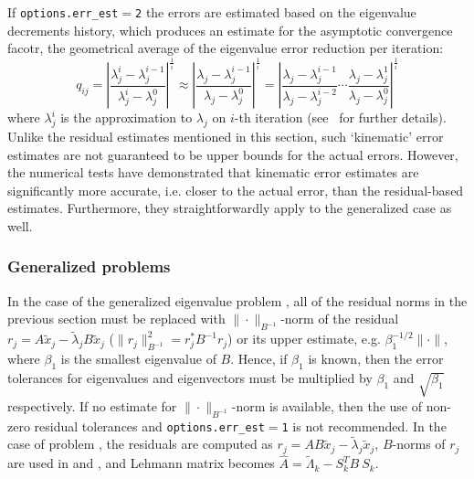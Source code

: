 If {\tt options.err\_est$=$2}
the errors are estimated
based on the eigenvalue decrements history,
which produces an estimate for 
the asymptotic convergence facotr,
the geometrical average of
the eigenvalue error reduction per iteration:
%
\begin{equation}
\label{acf}
q_{ij} =
\left|
\frac
{\lambda_j^i - \lambda_j^{i-1}}
{\lambda_j^i - \lambda_j^0}
\right|^\frac{1}{i}
\approx
\left|
\frac
{\lambda_j - \lambda_j^{i-1}}
{\lambda_j - \lambda_j^0}
\right|^\frac{1}{i}
=
\left|
\frac
{\lambda_j - \lambda_j^{i-1}}
{\lambda_j - \lambda_j^{i-2}}
\cdots
\frac
{\lambda_j - \lambda_j^1}
{\lambda_j - \lambda_j^0}
\right|^\frac{1}{i}
\end{equation}
%
where $\lambda_j^i$ is the approximation to $\lambda_j$ on
$i$-th iteration
(see \report\ for further details).
Unlike the residual estimates mentioned in this section, 
such `kinematic' error estimates are
not guaranteed to be upper bounds for the actual errors.
However, the numerical tests have demonstrated
that kinematic error estimates 
are significantly more accurate,
i.e. closer to the actual error,
than the residual-based estimates. 
Furthermore, they straightforwardly
apply to the generalized case as well.

\subsubsection{Generalized problems}

In the case
of the generalized eigenvalue problem ,
all of the residual norms in the previous section must be replaced
with %
$\|\cdot\|_{B^{-1}}$-norm of the residual
$r_j = A \tilde x_j - \tilde\lambda_j B \tilde x_j$
($\|r_j\|_{B^{-1}}^2 = r_j^* B^{-1} r_j$)
or its upper estimate, e.g. 
$\beta_1^{-1/2}\|\cdot\|$,
where $\beta_1$ is the smallest eigenvalue of $B$.
Hence, if $\beta_1$ is known, then
the error tolerances for eigenvalues and eigenvectors
must be multiplied by $\beta_1$ and $\sqrt{\beta_1}$
respectively. If no estimate for $\|\cdot\|_{B^{-1}}$-norm
is available, then the use of
non-zero residual tolerances and
{\tt options.err\_est$=$1}
is not recommended.
In the case of problem ,
the residuals are computed as
$r_j = A B \tilde x_j - \tilde \lambda_j \tilde x_j$,
$B$-norms of $r_j$ are used in  and ,
and Lehmann matrix becomes
$\hat A = \tilde\Lambda_k - S_k^T B\ S_k$.

